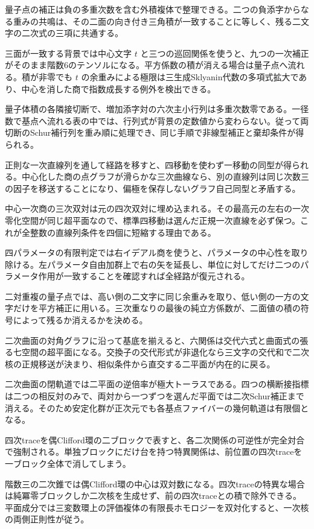 \documentclass[11pt,a4paper]{ltjsarticle}
\begin{document}
量子点の補正は負の多重次数を含む外積複体で整理できる。二つの負添字からなる重みの共鳴は、その二面の向き付き三角積が一致することに等しく、残る二文字の二次式の三項に共通する。

三面が一致する背景では中心文字 $t$ と三つの巡回関係を使うと、九つの一次補正がそのまま階数6のテンソルになる。平方係数の積が消える場合は量子点へ流れる。積が非零でも $t$ の余重みによる極限は三生成Sklyanin代数の多項式拡大であり、中心を消した商で指数成長する例外を検出できる。

量子体積の各隣接切断で、増加添字対の六次主小行列は多重次数零である。一径数で基点へ流れる表の中では、行列式が背景の定数値から変わらない。従って両切断のSchur補行列を重み順に処理でき、同じ手順で非線型補正と棄却条件が得られる。

正則な一次直線列を通して経路を移すと、四移動を使わず一移動の同型が得られる。中心化した商の点グラフが滑らかな三次曲線なら、別の直線列は同じ次数三の因子を移送することになり、偏極を保存しないグラフ自己同型と矛盾する。

中心一次商の三次双対は元の四次双対に埋め込まれる。その最高元の左右の一次零化空間が同じ超平面なので、標準四移動は選んだ正規一次直線を必ず保つ。これが全整数の直線列条件を四個に短縮する理由である。

四パラメータの有限判定では右イデアル商を使うと、パラメータの中心性を取り除ける。左パラメータ自由加群上で右の矢を延長し、単位に対してだけ二つのパラメータ作用が一致することを確認すれば全経路が復元される。

二対重複の量子点では、高い側の二文字に同じ余重みを取り、低い側の一方の文字だけを平方補正に用いる。三次重なりの最後の純立方係数が、二面値の積の符号によって残るか消えるかを決める。

二次曲面の対角グラフに沿って基底を揃えると、六関係は交代六式と曲面式の張る七空間の超平面になる。交換子の交代形式が非退化なら三文字の交代和で二次核の正規移送が決まり、相似条件から直交する二平面が内在的に戻る。

二次曲面の閉軌道では二平面の逆倍率が極大トーラスである。四つの横断接指標は二つの相反対のみで、両対から一つずつを選んだ平面では二次Schur補正まで消える。そのため安定化群が正次元でも各基点ファイバーの幾何軌道は有限個となる。

四次traceを偶Clifford環の二ブロックで表すと、各二次関係の可逆性が完全対合で強制される。単独ブロックにだけ台を持つ特異関係は、前位置の四次traceを一ブロック全体で消してしまう。

階数三の二次錐では偶Clifford環の中心は双対数になる。四次traceの特異な場合は純冪零ブロックしか二次核を生成せず、前の四次traceとの積で除外できる。平面成分では三変数環上の評価複体の有限長ホモロジーを双対化すると、一次核の両側正則性が従う。
\end{document}
